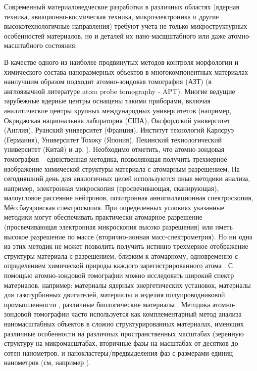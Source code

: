 
{\actuality} Современный материаловедческие разработки в различных областях (ядерная техника, авиационно-космическая техника, микроэлектроника и другие высокотехнологичные направления) требуют учета не только микроструктурных особенностей материалов, но и деталей их нано-масщштабного или даже атомно-масштабного состояния. 

В качестве одного из наиболее продвинутых методов контроля морфологии и химического состава наноразмерных объектов в многокомпонентных материалах наилучшим образом подходит атомно-зондовая томография (АЗТ) (в англоязычной литературе atom probe tomography - APT). Многие ведущие зарубежные ядерные центры оснащены такими приборами, включая аналитические центры крупных международных университетов (например, Окриджская национальная лаборатория (США), Оксфордский университет (Англия), Руанский университет (Франция), Институт технологий Карлсруэ (Германия), Университет Тохоку (Япония), Пекинский технологический университет (Китай) и др. \cite{APTlist}). Необходимо отметить, что атомно-зондовая томография – единственная методика, позволяющая получить трехмерное изображение химической структуры материала с атомарным разрешением. На сегодняшний день для аналогичных целей используются иные методики анализа, например, электронная микроскопия (просвечивающая, сканирующая), малоугловое рассеяние нейтронов, позитронная аннигилляционная спектроскопия, Мёссбауэровская спектроскопия. При определенных условиях указанные методики могут обеспечивать практически атомарное разрешение (просвечивающая электронная микроскопия высоко разрешения) или иметь высокое разрешение по массе (вторично-ионная масс-спектрометрия). Но ни одна из этих методик не может позволить получить истинно трехмерное отображение структуры материала с разрешением, близким к атомарному, одновременно с определением химической природы каждого зарегистрированного атома \cite{GaultBOOK}. С помощью атомно-зондовой томографии можно исследовать широкий спектр материалов, например: материалы ядерных энергетических установок, материалы для газотурбинных двигателей, материалы и изделия полупроводниковой промышленности \cite{Ulfig23}, различные биологические материалы \cite{Lee21}. Методика атомно-зондовой томографии часто используется как комплементарный метод анализа наномасштабных объектов в сложно структурированных материалах, имеющих различные особенности на различных пространственных масштабах (зеренную структуру на микромасштабах, вторичные фазы на масштабах от десятков до сотен нанометров, и нанокластеры/предвыделения фаз с размерами единиц нанометров (см, например \cite{Rogozhkin24_nano}).

